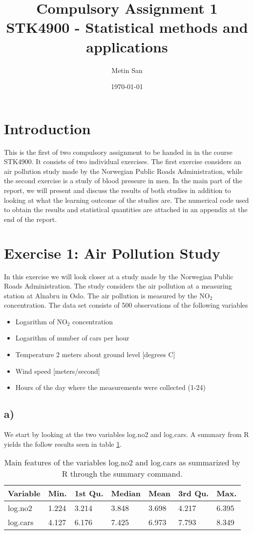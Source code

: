 \documentclass[a4paper, 10pt, reqno]{amsart}
\title[Compulsory Assignment 1]{\Large{Compulsory Assignment 1}\\
\normalsize{STK4900 - Statistical methods and applications}}
\author[Metin San]{Metin San}
\date{\today}
\begin{document}
\maketitle

\section{Introduction}
This is the first of two compulsory assignment to be handed in in the course STK4900. It consists of two individual exercises. The first exercise considers an air pollution study made by the Norwegian Public Roads Administration, while the second exercise is a study of blood pressure in men. In the main part of the report, we will present and discuss the results of both studies in addition to looking at what the learning outcome of the studies are. The numerical code used to obtain the results and statistical quantities are attached in an appendix at the end of the report.


\section{Exercise 1: Air Pollution Study}
In this exercise we will look closer at a study made by the Norwegian Public Roads Administration. The study considers the air pollution at a measuring station at Alnabru in Oslo. The air pollution is measured by the NO$_2$ concentration. The data set consists of 500 observations of the following variables

\begin{itemize}
    \item Logarithm of NO$_2$ concentration
    \item Logarithm of number of cars per hour
    \item Temperature 2 meters about ground level [degrees C]
    \item Wind speed [meters/second]
    \item Hours of the day where the measurements were collected (1-24)
\end{itemize}

\subsection{a)}
We start by looking at the two variables log.no2 and log.cars. A summary from R yields the follow results seen in table \ref{tab: summary}. 

\begin{table}[h]
\caption{Main features of the variables log.no2 and log.cars as summarized by R through the summary command.}
\label{tab: summary}
\begin{tabular}{lllllll}
\hline\hline
Variable & Min.  & 1st Qu. & Median & Mean  & 3rd Qu. & Max.  \\ \hline
log.no2 & 1.224 & 3.214   & 3.848  & 3.698 & 4.217   & 6.395 \\
log.cars   & 4.127 & 6.176   & 7.425  & 6.973 & 7.793   & 8.349\\
\hline
\end{tabular}
\end{table}
\end{document}
